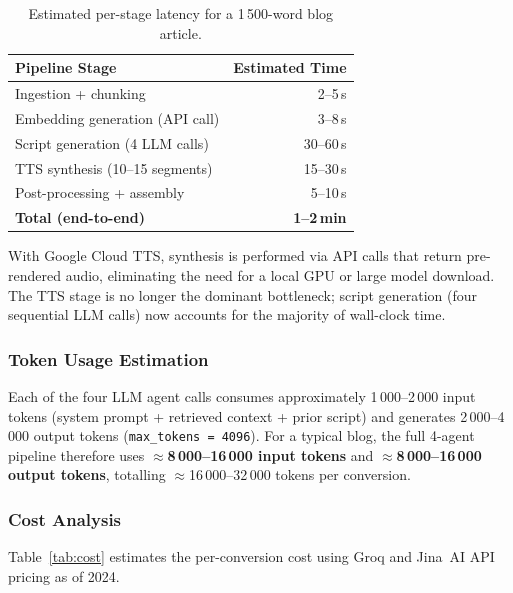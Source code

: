 \documentclass[sigconf,natbib=false]{acmart}   %
\begin{document}
\begin{table}[H]
\centering
\begin{tabular}{lr}
\toprule
\textbf{Pipeline Stage} & \textbf{Estimated Time}\\
\midrule
Ingestion + chunking             & 2--5\,s\\
Embedding generation (API call)  & 3--8\,s\\
Script generation (4 LLM calls)  & 30--60\,s\\
TTS synthesis (10--15 segments)  & 15--30\,s\\
Post-processing + assembly       & 5--10\,s\\
\midrule
\textbf{Total (end-to-end)}      & \textbf{1--2\,min}\\
\bottomrule
\end{tabular}
\caption{Estimated per-stage latency for a 1\,500-word blog article.}
\label{tab:latency}
\end{table}

With Google Cloud TTS, synthesis is performed via API calls that return pre-rendered audio, eliminating the need for a local GPU or large model download.  The TTS stage is no longer the dominant bottleneck; script generation (four sequential LLM calls) now accounts for the majority of wall-clock time.

\subsubsection{Token Usage Estimation}
Each of the four LLM agent calls consumes approximately 1\,000--2\,000 input tokens (system prompt + retrieved context + prior script) and generates 2\,000--4\,000 output tokens (\texttt{max\_tokens\,=\,4096}).  For a typical blog, the full 4-agent pipeline therefore uses \textbf{$\approx$8\,000--16\,000 input tokens} and \textbf{$\approx$8\,000--16\,000 output tokens}, totalling $\approx$16\,000--32\,000 tokens per conversion.

\subsubsection{Cost Analysis}
Table~\ref{tab:cost} estimates the per-conversion cost using Groq and Jina~AI API pricing as of 2024.
\end{document}
